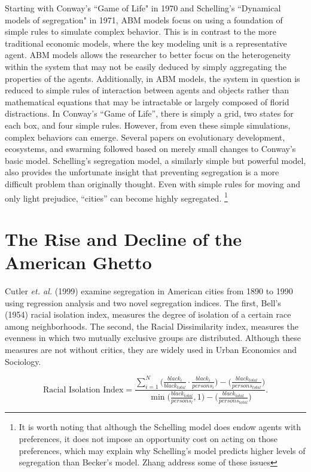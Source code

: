 \documentclass[11pt]{asaproc}
\newcommand{\1}{\mathbb{1}}
\begin{document}
Starting with Conway's ``Game of Life" in 1970 and Schelling's ``Dynamical models of segregation" in 1971, ABM models focus on using a foundation of simple rules to simulate complex behavior\citep{conway70,schelling71}. This is in contrast to the more traditional economic models, where the key modeling unit is a representative agent. ABM models allows the researcher to better focus on the heterogeneity within the system that may not be easily deduced by simply aggregating the properties of the agents. Additionally, in ABM models, the system in question is reduced to simple rules of interaction between agents and objects rather than mathematical equations that may be intractable or largely composed of florid distractions. In Conway's ``Game of Life'', there is simply a grid, two states for each box, and four simple rules. However, from even these simple simulations, complex behaviors can emerge. Several papers on evolutionary development, ecosystems, and swarming followed based on merely small changes to Conway's basic model. Schelling's segregation model, a similarly simple but powerful model, also provides the unfortunate insight that preventing segregation is a more difficult problem than originally thought. Even with simple rules for moving and only light prejudice, ``cities'' can become highly segregated\citep{schelling71}. \footnote{It is worth noting that although the Schelling model does endow agents with preferences, it does not impose an opportunity cost on acting on those preferences, which may explain why Schelling's model predicts higher levels of segregation than Becker's model. Zhang address some of these issues\citep{zhang11}}

\section{The Rise and Decline of the American Ghetto}
Cutler \textit{et. al.} (1999) examine segregation in American cities from 1890 to 1990 using regression analysis and two novel segregation indices. The first, Bell's (1954) racial isolation index, measures the degree of isolation of a certain race among neighborhoods\citep{bell54}. The second, the Racial Dissimilarity index, measures the evenness in which two mutually exclusive groups are distributed\citep{duncan55}. Although these measures are not without critics, they are widely used in Urban Economics and Sociology.

\begin{equation}
\label{eq:rii}
\mbox{Racial Isolation Index} = \frac{\sum_{i=1}^N\big(\frac{black_i}{black_{total}}\cdot\frac{black_i}{persons_i}\big)-\big(\frac{black_{total}}{persons_{total}}\big)}{\min\big(\frac{black_{total}}{persons_l},1\big)-\big(\frac{black_{total}}{persons_{total}}\big)} .
\end{equation}
\end{document}
